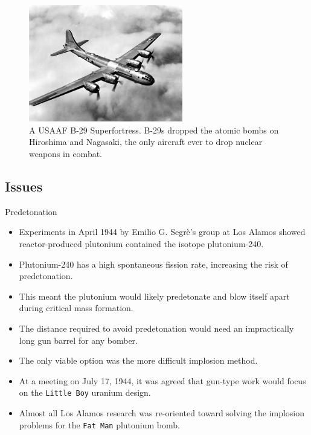 \documentclass{loyola-beamer}
\begin{document}
\begin{frame}
	\begin{figure}
		\begin{center}
			\includegraphics[width=0.6\textwidth]{figures/632px-B-29_in_flight.jpg}
		\end{center}
		\caption{A USAAF B-29 Superfortress. B-29s dropped the atomic bombs on Hiroshima and Nagasaki, the only aircraft ever to drop nuclear weapons in combat.}
	\end{figure}
\end{frame}

\subsection{Issues}

\begin{frame}{Predetonation}
	\begin{itemize}
		\item Experiments in April 1944 by Emilio G. Segrè's group at Los Alamos showed reactor-produced plutonium contained the isotope plutonium-240.
		\item Plutonium-240 has a high spontaneous fission rate, increasing the risk of predetonation.
		\item This meant the plutonium would likely predetonate and blow itself apart during critical mass formation.
		\item The distance required to avoid predetonation would need an impractically long gun barrel for any bomber.
	\end{itemize}
\end{frame}

\begin{frame}
	\begin{itemize}
		\item The only viable option was the more difficult implosion method.\cite{Hoddeson1993}
		\item At a meeting on July 17, 1944, it was agreed that gun-type work would focus on the \texttt{Little Boy} uranium design.
		\item Almost all Los Alamos research was re-oriented toward solving the implosion problems for the \texttt{Fat Man} plutonium bomb.
	\end{itemize}
\end{frame}
\end{document}

